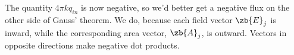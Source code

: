 The quantity $4\pi kq_{in}$ is now negative, so we'd better
get a negative flux on the other side of Gauss' theorem. We do, because
each field vector $\zb{E}_j$ is inward, while the corresponding area vector,
$\zb{A}_j$, is outward. Vectors in opposite directions make negative dot products.
